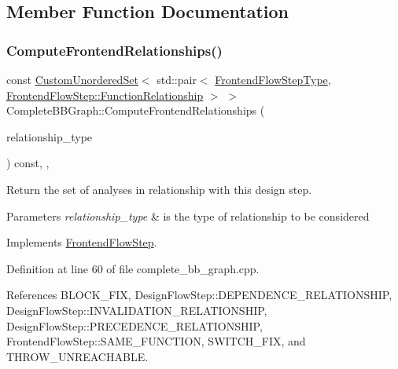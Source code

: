 \subsection{Member Function Documentation}
\mbox{\label{classCompleteBBGraph_a6c9c6ae98aaa799da86a86372a13e3e0}} 
\subsubsection{\texorpdfstring{Compute\+Frontend\+Relationships()}{ComputeFrontendRelationships()}}
{\footnotesize\ttfamily const \hyperlink{classCustomUnorderedSet}{Custom\+Unordered\+Set}$<$ std\+::pair$<$ \hyperlink{frontend__flow__step_8hpp_afeb3716c693d2b2e4ed3e6d04c3b63bb}{Frontend\+Flow\+Step\+Type}, \hyperlink{classFrontendFlowStep_af7cf30f2023e5b99e637dc2058289ab0}{Frontend\+Flow\+Step\+::\+Function\+Relationship} $>$ $>$ Complete\+B\+B\+Graph\+::\+Compute\+Frontend\+Relationships (\begin{DoxyParamCaption}\item[{const \hyperlink{classDesignFlowStep_a723a3baf19ff2ceb77bc13e099d0b1b7}{Design\+Flow\+Step\+::\+Relationship\+Type}}]{relationship\+\_\+type }\end{DoxyParamCaption}) const\hspace{0.3cm}{\ttfamily [override]}, {\ttfamily [private]}, {\ttfamily [virtual]}}



Return the set of analyses in relationship with this design step. 


\begin{DoxyParams}{Parameters}
{\em relationship\+\_\+type} & is the type of relationship to be considered \\
\hline
\end{DoxyParams}


Implements \hyperlink{classFrontendFlowStep_abeaff70b59734e462d347ed343dd700d}{Frontend\+Flow\+Step}.



Definition at line 60 of file complete\+\_\+bb\+\_\+graph.\+cpp.



References B\+L\+O\+C\+K\+\_\+\+F\+IX, Design\+Flow\+Step\+::\+D\+E\+P\+E\+N\+D\+E\+N\+C\+E\+\_\+\+R\+E\+L\+A\+T\+I\+O\+N\+S\+H\+IP, Design\+Flow\+Step\+::\+I\+N\+V\+A\+L\+I\+D\+A\+T\+I\+O\+N\+\_\+\+R\+E\+L\+A\+T\+I\+O\+N\+S\+H\+IP, Design\+Flow\+Step\+::\+P\+R\+E\+C\+E\+D\+E\+N\+C\+E\+\_\+\+R\+E\+L\+A\+T\+I\+O\+N\+S\+H\+IP, Frontend\+Flow\+Step\+::\+S\+A\+M\+E\+\_\+\+F\+U\+N\+C\+T\+I\+ON, S\+W\+I\+T\+C\+H\+\_\+\+F\+IX, and T\+H\+R\+O\+W\+\_\+\+U\+N\+R\+E\+A\+C\+H\+A\+B\+LE.

